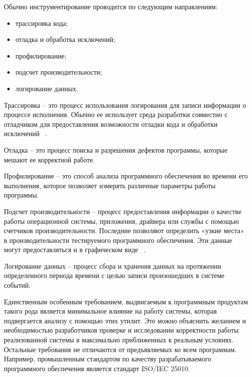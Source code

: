 Обычно инструментирование проводится по следующим направлениям:
\begin{itemize}
    \item трассировка кода;
    \item отладка и обработка исключений;
    \item профилирование;
    \item подсчет производительности;
    \item логирование данных.
\end{itemize}

Трассировка -- это процесс использования логирования для записи информации
о процессе исполнения. Обычно ее использует среда разработки совместно
с отладчиком для предоставления возможности отладки кода и обработки
исключений ~\cite{tracing_site}.

Отладка -- это процесс поиска и разрешения дефектов программы, которые
мешают ее корректной работе.

Профилирование -- это способ анализа программного обеспечения во времени
его выполнения, которое позволяет измерять различные параметры работы программы.

Подсчет производительности -- процесс предоставления информации о качестве
работы операционной системы, приложения, драйвера или службы с помощью
счетчиков производительности. Последние позволяют определить «узкие места»
в производительности тестируемого программного обеспечения. Эти данные
могут предоставляться и в графическом виде ~\cite{perfomance_counters_site}.

Логирование данных -- процесс сбора и хранения данных на протяжении определенного
периода времени с целью записи произошедших в системе событий.

Единственным особенным требованием, выдвигаемым к программным продуктам
такого рода является минимальное влияние на работу системы, которая подвергается
анализу с помощью этих утилит. Это можно объяснить желанием и необходимостью
разработчиков проверке и исследовании корректности работы реализованной системы
в максимально приближенных к реальным условиях. Остальные требования не отличаются
от предъявляемых ко всем программам. Например, промышленным стандартом
по качеству разрабатываемого программного обеспечения является стандарт
ISO/IEC 25010.

